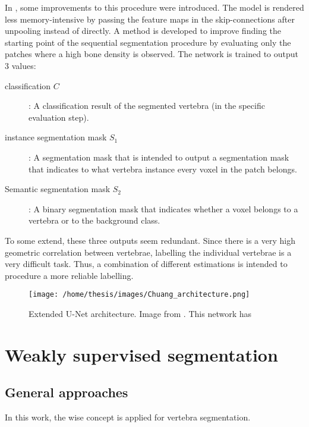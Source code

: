\par{
    In \cite{Chuang2019}, some improvements to this procedure were introduced.
    The model is rendered less memory-intensive by passing the feature maps in the skip-connections after unpooling instead of directly.
    A method is developed to improve finding the starting point of the sequential segmentation procedure by evaluating only the patches where a high bone density is observed.
    The network is trained to output 3 values:
    \begin{description}
        \item[classification $C$]: A classification result of the segmented vertebra (in the specific evaluation step).
        \item[instance segmentation mask $S_1$]: A segmentation mask that is intended to output a segmentation mask that indicates to what vertebra instance every voxel in the patch belongs. 
        \item[Semantic segmentation mask $S_2$]: A binary segmentation mask that indicates whether a voxel belongs to a vertebra or to the background class.
    \end{description}
    To some extend, these three outputs seem redundant. 
    Since there is a very high geometric correlation between vertebrae, labelling the individual vertebrae is a very difficult task.
    Thus, a combination of different estimations is intended to procedure a more reliable labelling.
}
\begin{SCfigure}[][htb]
    \texttt{[image: /home/thesis/images/Chuang\_architecture.png]}
    \caption{Extended U-Net architecture. Image from \cite{Chuang2019}.
    This network has }
    \label{fig:chuang_architecture}
\end{SCfigure}



\section{Weakly supervised segmentation}


\subsection{General approaches}


In this work, the \acrshort{wise} concept is applied for vertebra segmentation.


